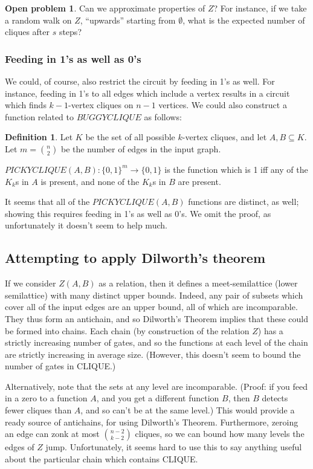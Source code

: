 \documentclass[12pt]{article}
\theoremstyle{definition}
\newtheorem{defn}{Definition}[section]
\newtheorem{prob}{Open problem}[section]
\begin{document}
\begin{prob}
\label{edgeZonkingApprox}
Can we approximate properties of $Z$? For instance, if we take a random walk
on $Z$, ``upwards'' starting from $\emptyset$,
what is the expected number of cliques after $s$ steps?
\end{prob}

\subsubsection{Feeding in 1's as well as 0's}

We could, of course, also restrict the circuit by feeding in 1's as well.
For instance, feeding in 1's to all edges which include a vertex results
in a circuit which finds $k-1$-vertex cliques on $n-1$ vertices.
We could also construct a function related to $BUGGYCLIQUE$ as follows:

\begin{defn}
\label{PICKYCLIQUE}
Let $K$ be the set of all possible
$k$-vertex cliques, and let $A, B \subseteq K$.
Let $m = {n \choose 2}$ be the number of edges in the input graph.

$PICKYCLIQUE(A,B): \{0,1\}^m \rightarrow \{0,1\}$ is the function which
is 1 iff any of the $K_k$s in $A$ is present, and none of the $K_k$s
in $B$ are present.
\end{defn}

It seems that all of the $PICKYCLIQUE(A,B)$ functions are distinct, as well;
showing this requires feeding in 1's as well as 0's.
We omit the proof, as unfortunately it doesn't seem to help much.

\subsection{Attempting to apply Dilworth's theorem}

If we consider $Z(A, B)$ as a relation, then it defines a meet-semilattice
(lower semilattice) with 
many distinct upper bounds.  Indeed, any pair of subsets which
cover all of the input edges are an upper bound, all of which
are incomparable. They thus form an antichain, and so Dilworth's Theorem
implies that these could be formed into chains. Each chain (by construction
of the relation $Z$) has a strictly increasing number of gates, and so the
functions at each level of the chain are strictly increasing in average
size. (However, this doesn't seem to bound the number of gates in CLIQUE.)

Alternatively, note that the sets at any level are incomparable. (Proof: if you feed in
a zero to a function $A$, and you get a different function $B$, then $B$
detects fewer cliques than $A$, and so can't be at the same level.)
This would provide a ready source of antichains,
for using Dilworth's Theorem.
Furthermore, zeroing an edge
can zonk at most ${n-2} \choose {k-2}$ cliques, so we can bound how
many levels the edges of $Z$ jump. Unfortunately, it seems hard to use
this to say anything useful about the particular chain which contains CLIQUE.
\end{document}
